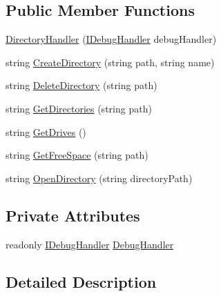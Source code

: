 \subsection*{Public Member Functions}
\begin{DoxyCompactItemize}
\item 
\mbox{\hyperlink{class_little_weeb_library_1_1_handlers_1_1_directory_handler_a347ba4ee0182625434973769c90d06e1}{Directory\+Handler}} (\mbox{\hyperlink{interface_little_weeb_library_1_1_handlers_1_1_i_debug_handler}{I\+Debug\+Handler}} debug\+Handler)
\item 
string \mbox{\hyperlink{class_little_weeb_library_1_1_handlers_1_1_directory_handler_a6be1b158ee280e8a74a49917a90484e2}{Create\+Directory}} (string path, string name)
\item 
string \mbox{\hyperlink{class_little_weeb_library_1_1_handlers_1_1_directory_handler_aeae514c438e071fe95c42ff74e0fef9d}{Delete\+Directory}} (string path)
\item 
string \mbox{\hyperlink{class_little_weeb_library_1_1_handlers_1_1_directory_handler_aa9d1414a83cadcf99da2cad30f39b2e3}{Get\+Directories}} (string path)
\item 
string \mbox{\hyperlink{class_little_weeb_library_1_1_handlers_1_1_directory_handler_a6ab9fa9b838eeca3f918429af0a3564d}{Get\+Drives}} ()
\item 
string \mbox{\hyperlink{class_little_weeb_library_1_1_handlers_1_1_directory_handler_aa439a303572de6bf09438d38a7fa4698}{Get\+Free\+Space}} (string path)
\item 
string \mbox{\hyperlink{class_little_weeb_library_1_1_handlers_1_1_directory_handler_a4f3f5841ead561873cc5130efc6294aa}{Open\+Directory}} (string directory\+Path)
\end{DoxyCompactItemize}
\subsection*{Private Attributes}
\begin{DoxyCompactItemize}
\item 
readonly \mbox{\hyperlink{interface_little_weeb_library_1_1_handlers_1_1_i_debug_handler}{I\+Debug\+Handler}} \mbox{\hyperlink{class_little_weeb_library_1_1_handlers_1_1_directory_handler_adb882b8ec72046e2b95b6d11228f6927}{Debug\+Handler}}
\end{DoxyCompactItemize}


\subsection{Detailed Description}


